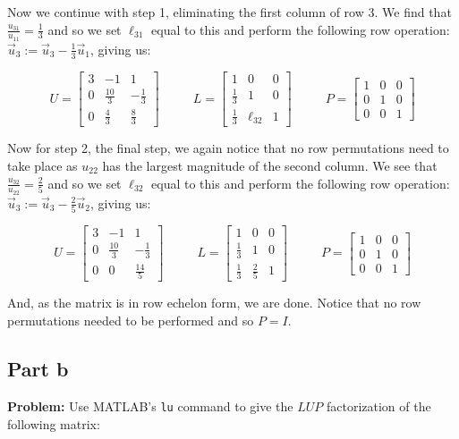 \documentclass{article}
\begin{document}
Now we continue with step 1, eliminating the first column of row 3. We find that $\frac{u_{31}}{u_{11}}=\frac{1}{3}$ and so we set $\ell_{31}$ equal to this and perform the following row operation: $\vec u_3:=\vec u_3-\frac{1}{3}\vec u_1$, giving us:

$$U=\begin{bmatrix}
3&-1&1\\0&\frac{10}{3}&-\frac{1}{3}\\0&\frac{4}{3}&\frac{8}{3}
\end{bmatrix}\ \ \ \ \ \ \ \ \ \ \ \
L=\begin{bmatrix}
1&0&0\\\frac{1}{3}&1&0\\\frac{1}{3}&\ell_{32}&1
\end{bmatrix}\ \ \ \ \ \ \ \ \ \ \ \
P=\begin{bmatrix}
1&0&0\\0&1&0\\0&0&1
\end{bmatrix}$$

Now for step 2, the final step, we again notice that no row permutations need to take place as $u_{22}$ has the largest magnitude of the second column.  We see that $\frac{u_{32}}{u_{22}}=\frac{2}{5}$ and so we set $\ell_{32}$ equal to this and perform the following row operation: $\vec u_3:=\vec u_3-\frac{2}{5}\vec u_2$, giving us:

$$U=\begin{bmatrix}
3&-1&1\\0&\frac{10}{3}&-\frac{1}{3}\\0&0&\frac{14}{5}
\end{bmatrix}\ \ \ \ \ \ \ \ \ \ \ \
L=\begin{bmatrix}
1&0&0\\\frac{1}{3}&1&0\\\frac{1}{3}&\frac{2}{5}&1
\end{bmatrix}\ \ \ \ \ \ \ \ \ \ \ \
P=\begin{bmatrix}
1&0&0\\0&1&0\\0&0&1
\end{bmatrix}$$

And, as the matrix is in row echelon form, we are done. Notice that no row permutations needed to be performed and so $P=I$.

\subsection*{Part b}
\textbf{Problem:} Use MATLAB's \verb|lu| command to give the $LUP$ factorization of the following matrix:
\end{document}
